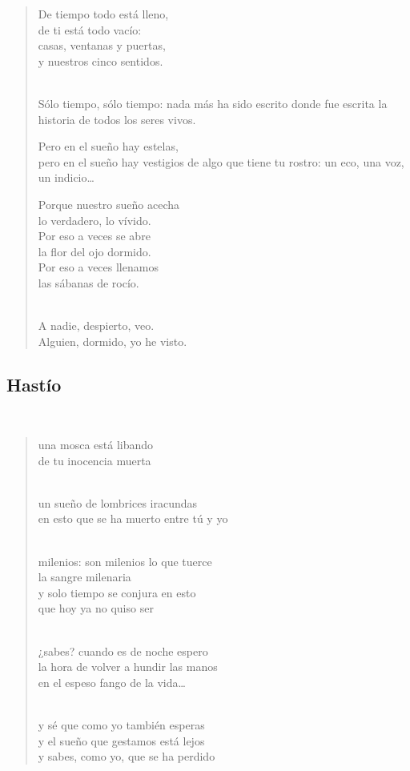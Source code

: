 \documentclass[a4paper, 12pt]{article}
\begin{document}
\begin{verse}
De tiempo todo está lleno,\\
de ti está todo vacío:\\
casas, ventanas y puertas,\\
y nuestros cinco sentidos.\\
~ 

Sólo tiempo, sólo tiempo:
nada más ha sido escrito 
donde fue escrita la historia 
de todos los seres vivos.
~ 

Pero en el sueño hay estelas,\\
pero en el sueño hay vestigios 
de algo que tiene tu rostro:
un eco, una voz, un indicio\ldots
~ 

Porque nuestro sueño acecha\\
lo verdadero, lo vívido.\\
Por eso a veces se abre\\
la flor del ojo dormido.\\
Por eso a veces llenamos\\
las sábanas de rocío.\\
~ 

A nadie, despierto, veo.\\
Alguien, dormido, yo he visto.\\
\end{verse}

\pagebreak 
\subsection{Hastío}
~ 

\begin{verse}
    
una mosca está libando\\
de tu inocencia muerta\\
~ 

un sueño de lombrices iracundas\\
en esto que se ha muerto entre tú y yo\\
~

milenios: son milenios lo que tuerce\\
la sangre milenaria\\
y solo tiempo se conjura en esto\\
que hoy ya no quiso ser\\
~ 

¿sabes? cuando es de noche espero\\
la hora de volver a hundir las manos\\
en el espeso fango de la vida…\\
~ 

y sé que como yo también esperas\\
y el sueño que gestamos está lejos\\
y sabes, como yo, que se ha perdido\\
\end{verse}
\end{document}
